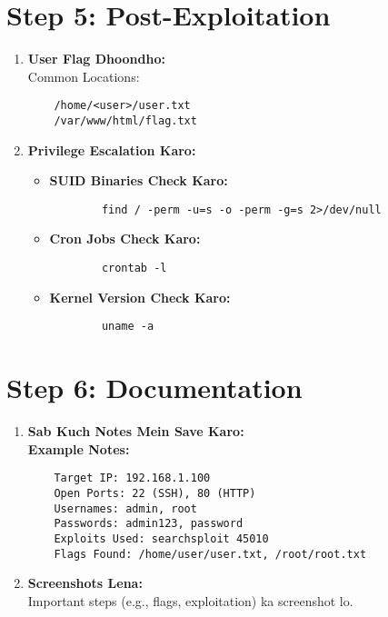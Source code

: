\documentclass[a4paper]{article}
\begin{document}
\section{Step 5: Post-Exploitation}
\begin{enumerate}
  \item \textbf{User Flag Dhoondho:} \\
    Common Locations: \\
    \begin{lstlisting}
    /home/<user>/user.txt  
    /var/www/html/flag.txt  
    \end{lstlisting}
  \item \textbf{Privilege Escalation Karo:} \\
    \begin{itemize}
      \item \textbf{SUID Binaries Check Karo:} \\
        \begin{lstlisting}
        find / -perm -u=s -o -perm -g=s 2>/dev/null  
        \end{lstlisting}
      \item \textbf{Cron Jobs Check Karo:} \\
        \begin{lstlisting}
        crontab -l  
        \end{lstlisting}
      \item \textbf{Kernel Version Check Karo:} \\
        \begin{lstlisting}
        uname -a  
        \end{lstlisting}
    \end{itemize}
\end{enumerate}

\section{Step 6: Documentation}
\begin{enumerate}
  \item \textbf{Sab Kuch Notes Mein Save Karo:} \\
    \textbf{Example Notes:} \\
    \begin{lstlisting}
    Target IP: 192.168.1.100  
    Open Ports: 22 (SSH), 80 (HTTP)  
    Usernames: admin, root  
    Passwords: admin123, password  
    Exploits Used: searchsploit 45010  
    Flags Found: /home/user/user.txt, /root/root.txt  
    \end{lstlisting}
  \item \textbf{Screenshots Lena:} \\
    Important steps (e.g., flags, exploitation) ka screenshot lo.
\end{enumerate}
\end{document}
